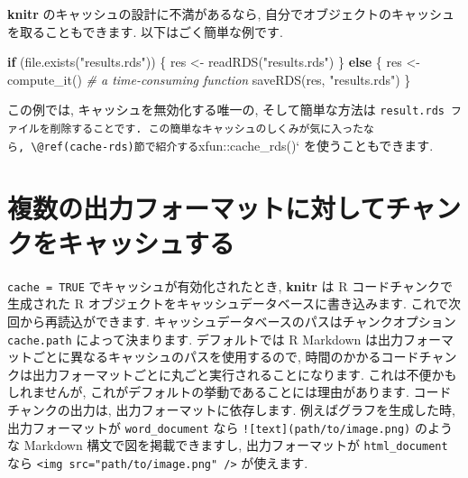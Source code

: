 \documentclass[
  11pt,
]{bxjsreport}
\newenvironment{Shaded}{\begin{snugshade}}{\end{snugshade}}
\newcommand{\CommentTok}[1]{\textcolor[rgb]{0.56,0.35,0.01}{\textit{#1}}}
\newcommand{\ControlFlowTok}[1]{\textcolor[rgb]{0.13,0.29,0.53}{\textbf{#1}}}
\newcommand{\FunctionTok}[1]{\textcolor[rgb]{0.00,0.00,0.00}{#1}}
\newcommand{\NormalTok}[1]{#1}
\newcommand{\OtherTok}[1]{\textcolor[rgb]{0.56,0.35,0.01}{#1}}
\newcommand{\StringTok}[1]{\textcolor[rgb]{0.31,0.60,0.02}{#1}}
\begin{document}
\textbf{knitr} のキャッシュの設計に不満があるなら, 自分でオブジェクトのキャッシュを取ることもできます. 以下はごく簡単な例です.

\begin{Shaded}
\begin{Highlighting}[numbers=left,,]
\ControlFlowTok{if}\NormalTok{ (}\FunctionTok{file.exists}\NormalTok{(}\StringTok{"results.rds"}\NormalTok{)) \{}
\NormalTok{  res }\OtherTok{\textless{}{-}} \FunctionTok{readRDS}\NormalTok{(}\StringTok{"results.rds"}\NormalTok{)}
\NormalTok{\} }\ControlFlowTok{else}\NormalTok{ \{}
\NormalTok{  res }\OtherTok{\textless{}{-}} \FunctionTok{compute\_it}\NormalTok{()  }\CommentTok{\# a time{-}consuming function}
  \FunctionTok{saveRDS}\NormalTok{(res, }\StringTok{"results.rds"}\NormalTok{)}
\NormalTok{\}}
\end{Highlighting}
\end{Shaded}

この例では, キャッシュを無効化する唯一の, そして簡単な方法は \texttt{result.rds\textasciigrave{}\textasciigrave{}\ ファイルを削除することです.\ この簡単なキャッシュのしくみが気に入ったなら,\ \textbackslash{}@ref(cache-rds)節で紹介する}xfun::cache\_rds()` を使うこともできます.

\hypertarget{cache-path}{%
\section{複数の出力フォーマットに対してチャンクをキャッシュする}\label{cache-path}}

\texttt{cache = TRUE} でキャッシュが有効化されたとき, \textbf{knitr} は R コードチャンクで生成された R オブジェクトをキャッシュデータベースに書き込みます. これで次回から再読込ができます. キャッシュデータベースのパスはチャンクオプション \texttt{cache.path} によって決まります. デフォルトでは R Markdown は出力フォーマットごとに異なるキャッシュのパスを使用するので, 時間のかかるコードチャンクは出力フォーマットごとに丸ごと実行されることになります. これは不便かもしれませんが, これがデフォルトの挙動であることには理由があります. コードチャンクの出力は, 出力フォーマットに依存します. 例えばグラフを生成した時, 出力フォーマットが \texttt{word\_document} なら \texttt{!{[}text{]}(path/to/image.png)} のような Markdown 構文で図を掲載できますし, 出力フォーマットが \texttt{html\_document} なら \texttt{\textless{}img\ src="path/to/image.png"\ /\textgreater{}} が使えます.
\end{document}

